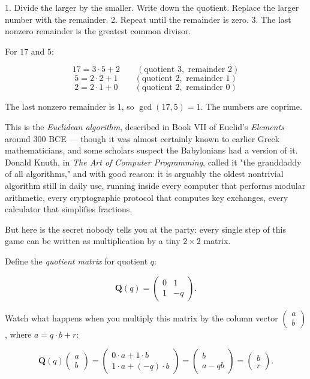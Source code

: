 1. Divide the larger by the smaller. Write down the quotient. Replace the larger number with the remainder.
2. Repeat until the remainder is zero.
3. The last nonzero remainder is the greatest common divisor.

For $17$ and $5$:

\[
17 = 3 \cdot 5 + 2 \qquad (\text{quotient } 3, \text{ remainder } 2)
\]
\[
5 = 2 \cdot 2 + 1 \qquad (\text{quotient } 2, \text{ remainder } 1)
\]
\[
2 = 2 \cdot 1 + 0 \qquad (\text{quotient } 2, \text{ remainder } 0)
\]

The last nonzero remainder is $1$, so $\gcd(17, 5) = 1$. The numbers are coprime.

This is the \textit{Euclidean algorithm}, described in Book VII of Euclid's \textit{Elements} around 300 BCE --- though it was almost certainly known to earlier Greek mathematicians, and some scholars suspect the Babylonians had a version of it. Donald Knuth, in \textit{The Art of Computer Programming}, called it "the granddaddy of all algorithms," and with good reason: it is arguably the oldest nontrivial algorithm still in daily use, running inside every computer that performs modular arithmetic, every cryptographic protocol that computes key exchanges, every calculator that simplifies fractions.

But here is the secret nobody tells you at the party: every single step of this game can be written as multiplication by a tiny $2 \times 2$ matrix.

Define the \textit{quotient matrix} for quotient $q$:

\[
\mathbf{Q}(q) = \begin{pmatrix} 0 & 1 \\ 1 & -q \end{pmatrix}.
\]

Watch what happens when you multiply this matrix by the column vector $\begin{pmatrix} a \\ b \end{pmatrix}$, where $a = q \cdot b + r$:

\[
\mathbf{Q}(q) \begin{pmatrix} a \\ b \end{pmatrix} = \begin{pmatrix} 0 \cdot a + 1 \cdot b \\ 1 \cdot a + (-q) \cdot b \end{pmatrix} = \begin{pmatrix} b \\ a - qb \end{pmatrix} = \begin{pmatrix} b \\ r \end{pmatrix}.
\]

